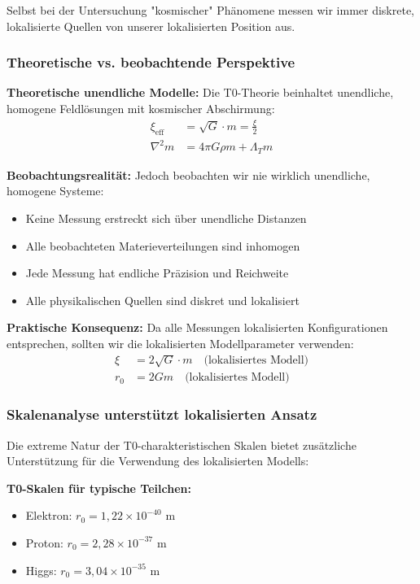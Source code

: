 \documentclass[12pt,a4paper]{article}
\begin{document}
Selbst bei der Untersuchung "kosmischer" Phänomene messen wir immer diskrete, lokalisierte Quellen von unserer lokalisierten Position aus.

\subsubsection{Theoretische vs. beobachtende Perspektive}
\label{subsubsec:theoretical_vs_observational}

\textbf{Theoretische unendliche Modelle:}
Die T0-Theorie beinhaltet unendliche, homogene Feldlösungen mit kosmischer Abschirmung:
\begin{align}
	\xi_{\text{eff}} &= \sqrt{G} \cdot m = \frac{\xi}{2} \\
	\nabla^2 m &= 4\pi G \rho m + \Lambda_T m
\end{align}

\textbf{Beobachtungsrealität:}
Jedoch beobachten wir nie wirklich unendliche, homogene Systeme:
\begin{itemize}
	\item Keine Messung erstreckt sich über unendliche Distanzen
	\item Alle beobachteten Materieverteilungen sind inhomogen
	\item Jede Messung hat endliche Präzision und Reichweite
	\item Alle physikalischen Quellen sind diskret und lokalisiert
\end{itemize}

\textbf{Praktische Konsequenz:}
Da alle Messungen lokalisierten Konfigurationen entsprechen, sollten wir die lokalisierten Modellparameter verwenden:
\begin{align}
	\xi &= 2\sqrt{G} \cdot m \quad \text{(lokalisiertes Modell)} \\
	r_0 &= 2Gm \quad \text{(lokalisiertes Modell)}
\end{align}

\subsubsection{Skalenanalyse unterstützt lokalisierten Ansatz}
\label{subsubsec:scale_analysis_localized}

Die extreme Natur der T0-charakteristischen Skalen bietet zusätzliche Unterstützung für die Verwendung des lokalisierten Modells:

\textbf{T0-Skalen für typische Teilchen:}
\begin{itemize}
	\item Elektron: $r_0 = 1,22 \times 10^{-40}$ m
	\item Proton: $r_0 = 2,28 \times 10^{-37}$ m  
	\item Higgs: $r_0 = 3,04 \times 10^{-35}$ m
\end{itemize}
\end{document}
